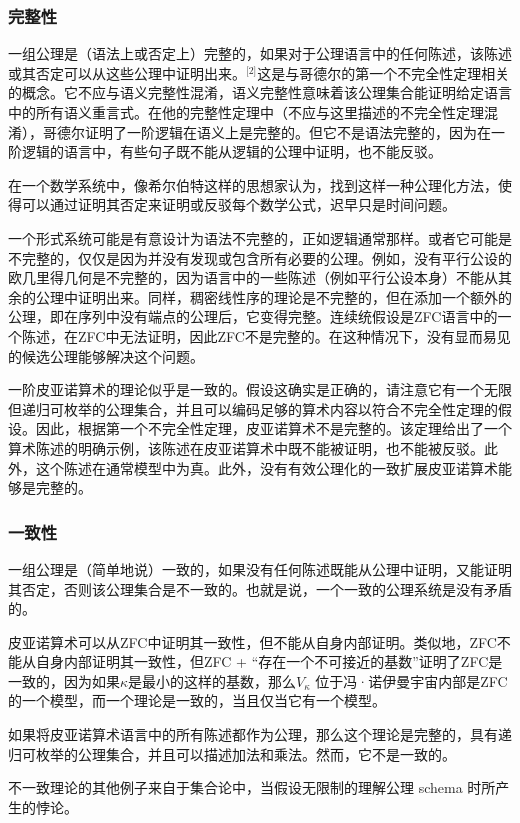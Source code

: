 \subsubsection{完整性}  
一组公理是（语法上或否定上）完整的，如果对于公理语言中的任何陈述，该陈述或其否定可以从这些公理中证明出来。\(^\text{[2]}\)这是与哥德尔的第一个不完全性定理相关的概念。它不应与语义完整性混淆，语义完整性意味着该公理集合能证明给定语言中的所有语义重言式。在他的完整性定理中（不应与这里描述的不完全性定理混淆），哥德尔证明了一阶逻辑在语义上是完整的。但它不是语法完整的，因为在一阶逻辑的语言中，有些句子既不能从逻辑的公理中证明，也不能反驳。

在一个数学系统中，像希尔伯特这样的思想家认为，找到这样一种公理化方法，使得可以通过证明其否定来证明或反驳每个数学公式，迟早只是时间问题。

一个形式系统可能是有意设计为语法不完整的，正如逻辑通常那样。或者它可能是不完整的，仅仅是因为并没有发现或包含所有必要的公理。例如，没有平行公设的欧几里得几何是不完整的，因为语言中的一些陈述（例如平行公设本身）不能从其余的公理中证明出来。同样，稠密线性序的理论是不完整的，但在添加一个额外的公理，即在序列中没有端点的公理后，它变得完整。连续统假设是ZFC语言中的一个陈述，在ZFC中无法证明，因此ZFC不是完整的。在这种情况下，没有显而易见的候选公理能够解决这个问题。

一阶皮亚诺算术的理论似乎是一致的。假设这确实是正确的，请注意它有一个无限但递归可枚举的公理集合，并且可以编码足够的算术内容以符合不完全性定理的假设。因此，根据第一个不完全性定理，皮亚诺算术不是完整的。该定理给出了一个算术陈述的明确示例，该陈述在皮亚诺算术中既不能被证明，也不能被反驳。此外，这个陈述在通常模型中为真。此外，没有有效公理化的一致扩展皮亚诺算术能够是完整的。
\subsubsection{一致性}  
一组公理是（简单地说）一致的，如果没有任何陈述既能从公理中证明，又能证明其否定，否则该公理集合是不一致的。也就是说，一个一致的公理系统是没有矛盾的。

皮亚诺算术可以从ZFC中证明其一致性，但不能从自身内部证明。类似地，ZFC不能从自身内部证明其一致性，但ZFC + “存在一个不可接近的基数”证明了ZFC是一致的，因为如果\( \kappa \)是最小的这样的基数，那么\( V_\kappa \) 位于冯·诺伊曼宇宙内部是ZFC的一个模型，而一个理论是一致的，当且仅当它有一个模型。

如果将皮亚诺算术语言中的所有陈述都作为公理，那么这个理论是完整的，具有递归可枚举的公理集合，并且可以描述加法和乘法。然而，它不是一致的。

不一致理论的其他例子来自于集合论中，当假设无限制的理解公理 schema 时所产生的悖论。
